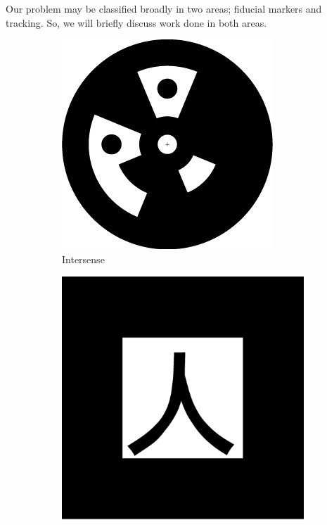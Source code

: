 \documentclass[runningheads]{llncs}
\begin{document}
Our problem may be classified broadly in two areas; fiducial markers and
tracking. So, we will briefly discuss work done in both areas.
\begin{figure}
 \begin{subfigure}[b]{0.19\textwidth}
  \centering
  \includegraphics[width=\linewidth]{intersense.jpg}
  Intersense\cite{NaimarkF02}  
 \end{subfigure}
 \begin{subfigure}[b]{0.19\textwidth}  
 \centering 
  \includegraphics[width=\linewidth]{pattKanji.pdf}

\end{subfigure}
\end{figure}
\end{document}
